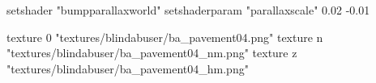 	setshader "bumpparallaxworld"
	setshaderparam "parallaxscale" 0.02 -0.01

		texture 0 "textures/blindabuser/ba_pavement04.png"
		texture n "textures/blindabuser/ba_pavement04_nm.png"
		texture z "textures/blindabuser/ba_pavement04_hm.png"
